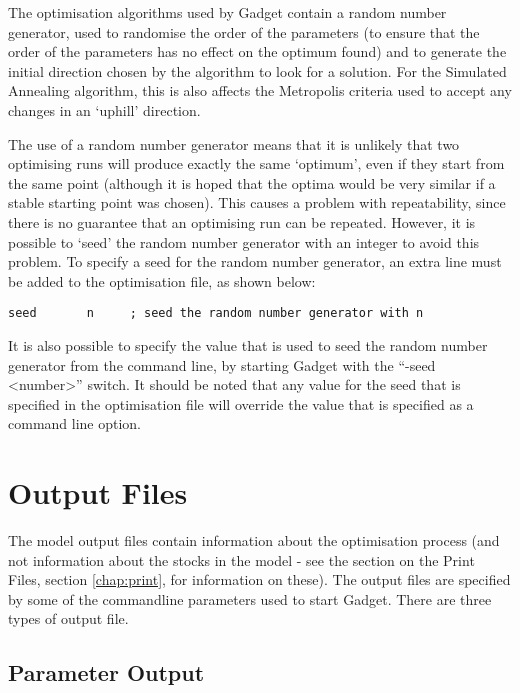 \documentclass[]{book}
\begin{document}
The optimisation algorithms used by Gadget contain a random number
generator, used to randomise the order of the parameters (to ensure that
the order of the parameters has no effect on the optimum found) and to
generate the initial direction chosen by the algorithm to look for a
solution. For the Simulated Annealing algorithm, this is also affects
the Metropolis criteria used to accept any changes in an `uphill'
direction.

The use of a random number generator means that it is unlikely that two
optimising runs will produce exactly the same `optimum', even if they
start from the same point (although it is hoped that the optima would be
very similar if a stable starting point was chosen). This causes a
problem with repeatability, since there is no guarantee that an
optimising run can be repeated. However, it is possible to `seed' the
random number generator with an integer to avoid this problem. To
specify a seed for the random number generator, an extra line must be
added to the optimisation file, as shown below:

\begin{verbatim}
seed       n     ; seed the random number generator with n
\end{verbatim}

It is also possible to specify the value that is used to seed the random
number generator from the command line, by starting Gadget with the
``-seed \textless{}number\textgreater{}'' switch. It should be noted that any value for the
seed that is specified in the optimisation file will override the value
that is specified as a command line option.

\hypertarget{chap:output}{%
\chapter{Output Files}\label{chap:output}}

The model output files contain information about the optimisation
process (and not information about the stocks in the model - see the
section on the Print Files,
section \ref{chap:print},
for information on these). The output files are specified by some of the
commandline parameters used to start Gadget. There are three types of
output file.

\hypertarget{sec:paramoutput}{%
\section{Parameter Output}\label{sec:paramoutput}}
\end{document}
